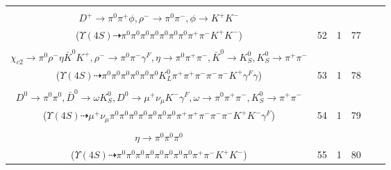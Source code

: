 \documentclass[landscape]{article}
\newcounter{rownumbers}
\newcommand\rn{\stepcounter{rownumbers}\arabic{rownumbers}}
\newcommand{\EOLP}{\\ \hline} %
\newcommand{\topoTags}[1]{#1} %
\begin{document}
\begin{longtable}{clcccc}
\rn & \makecell[l]{ $ 
\Upsilon(4S) \rightarrow B^{0} \bar{B}^{0} ,
B^{0} \rightarrow \pi^{0} \bar{D}^{0} ,
\bar{B}^{0} \rightarrow D^{*+} a_{1}^{-} ,
\bar{D}^{0} \rightarrow \pi^{0} \pi^{0} ,
D^{*+} \rightarrow \pi^{0} D^{+} ,
a_{1}^{-} \rightarrow \pi^{0} \rho^{-} ,
$ \\ $
D^{+} \rightarrow \pi^{0} \pi^{+} \phi ,
\rho^{-} \rightarrow \pi^{0} \pi^{-} ,
\phi \rightarrow K^{+} K^{-} 
$ \\ ($
\Upsilon(4S) \dashrightarrow \pi^{0} \pi^{0} \pi^{0} \pi^{0} \pi^{0} \pi^{0} \pi^{0} \pi^{+} \pi^{-} K^{+} K^{-} 
$) } & \topoTags{52 & }1 & 77 \EOLP

\rn & \makecell[l]{ $ 
\Upsilon(4S) \rightarrow B^{0} \bar{B}^{0} ,
B^{0} \rightarrow \pi^{0} \bar{D}^{0} ,
\bar{B}^{0} \rightarrow \bar{K}^{0} \psi^{\prime} ,
\bar{D}^{0} \rightarrow \pi^{0} \pi^{0} ,
\bar{K}^{0} \rightarrow K_{L}^{0} ,
\psi^{\prime} \rightarrow \chi_{c2} \gamma ,
$ \\ $
\chi_{c2} \rightarrow \pi^{0} \rho^{-} \eta \bar{K}^{0} K^{+} ,
\rho^{-} \rightarrow \pi^{0} \pi^{-} \gamma^{F} ,
\eta \rightarrow \pi^{0} \pi^{+} \pi^{-} ,
\bar{K}^{0} \rightarrow K_{S}^{0} ,
K_{S}^{0} \rightarrow \pi^{+} \pi^{-} 
$ \\ ($
\Upsilon(4S) \dashrightarrow \pi^{0} \pi^{0} \pi^{0} \pi^{0} \pi^{0} \pi^{0} K_{L}^{0} \pi^{+} \pi^{+} \pi^{-} \pi^{-} \pi^{-} K^{+} \gamma^{F} \gamma 
$) } & \topoTags{53 & }1 & 78 \EOLP

\rn & \makecell[l]{ $ 
\Upsilon(4S) \rightarrow B^{0} \bar{B}^{0} ,
B^{0} \rightarrow \pi^{0} K^{*+} D^{*-} D^{*0} ,
\bar{B}^{0} \rightarrow \pi^{0} D^{0} ,
K^{*+} \rightarrow \pi^{0} K^{+} ,
D^{*-} \rightarrow \pi^{-} \bar{D}^{0} ,
D^{*0} \rightarrow \pi^{0} D^{0} ,
$ \\ $
D^{0} \rightarrow \pi^{0} \pi^{0} ,
\bar{D}^{0} \rightarrow \omega K_{S}^{0} ,
D^{0} \rightarrow \mu^{+} \nu_{\mu} K^{-} \gamma^{F} ,
\omega \rightarrow \pi^{0} \pi^{+} \pi^{-} ,
K_{S}^{0} \rightarrow \pi^{+} \pi^{-} 
$ \\ ($
\Upsilon(4S) \dashrightarrow \mu^{+} \nu_{\mu} \pi^{0} \pi^{0} \pi^{0} \pi^{0} \pi^{0} \pi^{0} \pi^{0} \pi^{+} \pi^{+} \pi^{-} \pi^{-} \pi^{-} K^{+} K^{-} \gamma^{F} 
$) } & \topoTags{54 & }1 & 79 \EOLP

\rn & \makecell[l]{ $ 
\Upsilon(4S) \rightarrow \bar{B}^{0} \bar{B}^{0} ,
\bar{B}^{0} \rightarrow \pi^{0} D^{0} ,
\bar{B}^{0} \rightarrow \pi^{0} \pi^{+} K^{+} K^{-} D_{s}^{-} ,
D^{0} \rightarrow \pi^{0} \pi^{0} ,
D_{s}^{-} \rightarrow \rho^{-} \eta ,
\rho^{-} \rightarrow \pi^{0} \pi^{-} ,
$ \\ $
\eta \rightarrow \pi^{0} \pi^{0} \pi^{0} 
$ \\ ($
\Upsilon(4S) \dashrightarrow \pi^{0} \pi^{0} \pi^{0} \pi^{0} \pi^{0} \pi^{0} \pi^{0} \pi^{0} \pi^{+} \pi^{-} K^{+} K^{-} 
$) } & \topoTags{55 & }1 & 80 \EOLP


\end{longtable}
\end{document}
